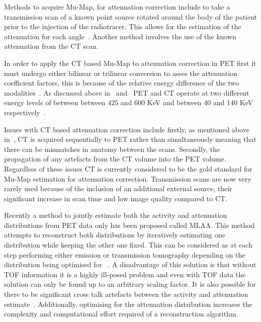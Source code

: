                 Methods to acquire \gls{Mu-Map}, for attenuation correction include to take a transmission scan of a known point source rotated around the body of the patient prior to the injection of the radiotracer. This allows for the estimation of the attenuation for each angle~\parencite{TransmissionatnBib}. Another method involves the use of the known attenuation from the \gls{CT} scan.
                
                In order to apply the \gls{CT} based \gls{Mu-Map} to attenuation correction in \gls{PET} first it must undergo either bilinear or trilinear conversion to asses the attenuation coefficient factors, this is because of the relative energy difference of the two modalities~\parencite{Carney2006}. As discussed above in~ and~ \gls{PET} and \gls{CT} operate at two different energy levels of between between $425$ and $600$ \gls{KeV} and between $40$ and $140$ \gls{KeV} respectively~\parencite{Bettinardi2011, CTattenuationenergyBib}.
                
                Issues with \gls{CT} based attenuation correction include firstly, as mentioned above in~, \gls{CT} is acquired sequentially to \gls{PET} rather than simultaneously meaning that there can be mismatches in anatomy between the scans. Secondly, the propagation of any artefacts from the \gls{CT} volume into the \gls{PET} volume. Regardless of these issues \gls{CT} is currently considered to be the gold standard for \gls{Mu-Map} estimation for attenuation correction. Transmission scans are now very rarely used because of the inclusion of an additional external source, their significant increase in scan time and low image quality compared to \gls{CT}. 
                
                Recently a method to jointly estimate both the activity and attenuation distributions from \gls{PET} data only has been proposed called \gls{MLAA}. This method attempts to reconstruct both distributions by iteratively estimating one distribution while keeping the other one fixed. This can be considered as at each step performing either emission or transmission tomography depending on the distribution being optimised for%
                ~\parencite{Fuin2017, Brusaferri2020JointPET}. A disadvantage of this solution is that without \gls{TOF} information it is a highly ill-posed problem and even with \gls{TOF} data the solution can only be found up to an arbitrary scaling factor. It is also possible for there to be significant cross talk artefacts between the activity and attenuation estimate~\parencite{MLAASalomonBib, MLAADefriseBib}. Additionally, optimising for the attenuation distribution increases the complexity and computational effort required of a reconstruction algorithm.
                
